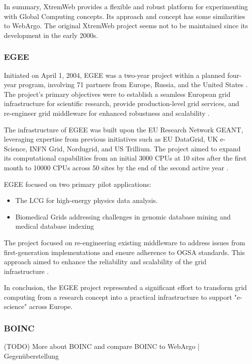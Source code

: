 In summary, XtremWeb provides a flexible and robust platform for experimenting with Global Computing concepts. Its approach and concept has some similarities to WebArgo. The original XtremWeb project seems not to be maintained since its development in the early 2000s.

\subsubsection{EGEE}
\label{subsec:background:related_work:egee}
Initiated on April 1, 2004, \ac{EGEE} was a two-year project within a planned four-year program, involving 71 partners from Europe, Russia, and the United States \cite{relatedwork:egee}. The project's primary objectives were to establish a seamless European grid infrastructure for scientific research, provide production-level grid services, and re-engineer grid middleware for enhanced robustness and scalability \cite{relatedwork:egee}.

The infrastructure of \ac{EGEE} was built upon the EU Research Network GEANT, leveraging expertise from previous initiatives such as EU DataGrid, UK e-Science, INFN Grid, Nordugrid, and US Trillium. The project aimed to expand its computational capabilities from an initial 3000 \acs{CPU}s at 10 sites after the first month to 10000 \acs{CPU}s across 50 sites by the end of the second active year \cite{relatedwork:egee}.

\ac{EGEE} focused on two primary pilot applications: 
\begin{itemize}
  \item The \ac{LCG} for high-energy physics data analysis.
  \item Biomedical Grids addressing challenges in genomic database mining and medical database indexing
\end{itemize}
The project focused on re-engineering existing middleware to address issues from first-generation implementations and ensure adherence to \ac{OGSA} standards. This approach aimed to enhance the reliability and scalability of the grid infrastructure \cite{relatedwork:egee}.

In conclusion, the \ac{EGEE} project represented a significant effort to transform grid computing from a research concept into a practical infrastructure to support "e-science" across Europe.

\subsubsection{BOINC}
\label{subsec:background:related_work:boinc}
(TODO) More about BOINC and compare BOINC to WebArgo | Gegenüberstellung

